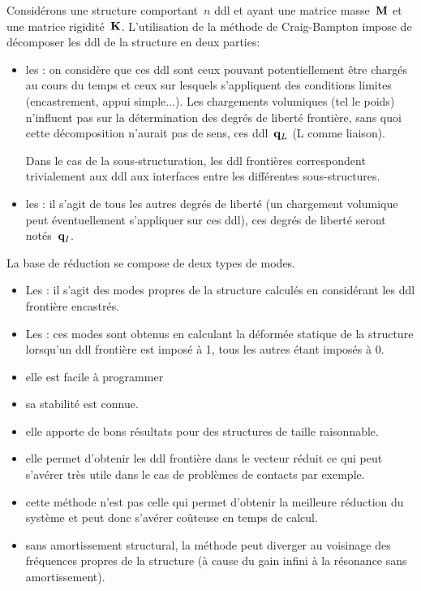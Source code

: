 Considérons une structure comportant~$n$ ddl et ayant une matrice masse~$\MM{M}$ et une matrice rigidité~$\MM{K}$.
L'utilisation de la méthode de Craig-Bampton
impose de décomposer les ddl de la structure en deux parties:
\begin{itemize}
  \item les : on considère que ces ddl sont ceux pouvant potentiellement être chargés au cours du temps
	et ceux sur lesquels s'appliquent des conditions limites (encastrement, appui simple...). Les chargements volumiques
	(tel le poids) n'influent pas sur la détermination des degrés de liberté frontière, sans quoi cette décomposition n'aurait
	pas de sens, ces ddl~$\VV{q}_L$ (L comme liaison).

	Dans le cas de la sous-structuration, les ddl frontières correspondent trivialement aux ddl aux interfaces entre
	les différentes sous-structures.
  \item les : il s'agit de tous les autres degrés de liberté (un chargement volumique peut éventuellement
	s'appliquer sur ces ddl), ces degrés de liberté seront notés~$\VV{q}_I$.
\end{itemize}
\medskipvm
La base de réduction se compose de deux types de modes.
\begin{itemize}
  \item Les : il s'agit des modes propres de la structure calculés en considérant les ddl frontière encastrés.
  \item Les : ces modes sont obtenus en calculant la déformée statique de la structure lorsqu'un ddl frontière
	est imposé à 1, tous les autres étant imposés à 0.
\end{itemize}
\medskipvm
{}
\begin{itemize}
  \item elle est facile à programmer
  \item sa stabilité est connue.
  \item elle apporte de bons résultats pour des structures de taille raisonnable.
  \item elle permet d'obtenir les ddl frontière dans le vecteur réduit ce qui peut s'avérer très utile dans le cas de problèmes de contacts
	par exemple.
\end{itemize}
\medskipvm
{}
\begin{itemize}
  \item cette méthode n'est pas celle qui permet d'obtenir la meilleure réduction du système et peut donc s'avérer coûteuse en temps de calcul.
  \item sans amortissement structural, la méthode peut diverger au voisinage des fréquences propres de la structure (à cause du gain infini à
	la résonance sans amortissement).
\end{itemize}


